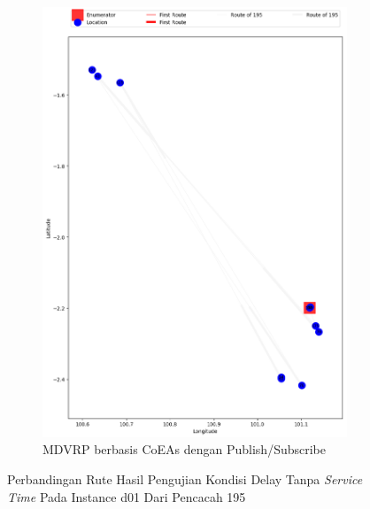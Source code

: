 \begin{figure}[H]\ContinuedFloat
	\centering
	\begin{subfigure}[t]{\textwidth}
		\centering
		\includegraphics[width=\textwidth]{Resources/Images/delayed_1/real_m15_n100_delayed_1_195_pubsub_coes}
		\caption{MDVRP berbasis CoEAs dengan Publish/Subscribe}
		\label{fig:real_m15_n100_delayed_1_195_pubsub_coes}
	\end{subfigure}
	\caption{Perbandingan Rute Hasil Pengujian Kondisi Delay Tanpa \textit{Service Time} Pada Instance d01 Dari Pencacah 195}
	\label{fig:real_m15_n100_delayed_1_195_contd}
\end{figure}


